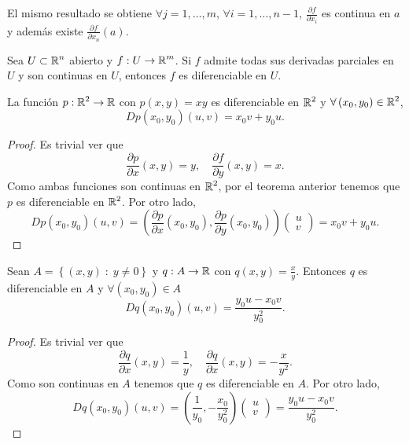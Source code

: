 \begin{observation}
El mismo resultado se obtiene $\displaystyle \forall j = 1, \ldots, m $, $\displaystyle \forall i = 1, \ldots, n-1 $, $\displaystyle \frac{\partial f}{\partial x_{i}} $ es continua en $\displaystyle a $ y además existe $\displaystyle \frac{\partial f}{\partial x_{n}}\left(a\right) $.
\end{observation}
\begin{colorary}
Sea $\displaystyle U \subset \mathbb{R}^{n} $ abierto y $\displaystyle f : U \to \mathbb{R}^{m} $. Si $\displaystyle f $ admite todas sus derivadas parciales en $\displaystyle U $ y son continuas en $\displaystyle U $, entonces $\displaystyle f $ es diferenciable en $\displaystyle U $.
\end{colorary}
\begin{lema}
La función $\displaystyle p : \mathbb{R}^{2} \to \mathbb{R} $ con $\displaystyle p\left(x,y\right) = xy $ es diferenciable en $\displaystyle \mathbb{R}^{2} $ y $\displaystyle \forall \left(x_{0}, y_{0}\right) \in \mathbb{R}^{2} $,
\[Dp\left(x_{0},y_{0}\right)\left(u,v\right) = x_{0}v + y_{0}u .\]
\end{lema}
\begin{proof}
Es trivial ver que
\[\frac{\partial p}{\partial x}\left(x,y\right) = y, \quad \frac{\partial f}{\partial y}\left(x,y\right) = x .\]
Como ambas funciones son continuas en $\displaystyle \mathbb{R}^{2} $, por el teorema anterior tenemos que $\displaystyle p $ es diferenciable en $\displaystyle \mathbb{R}^{2} $. Por otro lado,
\[Dp\left(x_{0},y_{0}\right)\left(u,v\right) = \left(\frac{\partial p}{\partial x}\left(x_{0}, y_{0}\right), \frac{\partial p}{\partial y}\left(x_{0}, y_{0}\right)\right)\begin{pmatrix} u \\ v \end{pmatrix} = x_{0}v + y_{0}u .\]
\end{proof}
\begin{lema}
	Sean $\displaystyle A = \left\{ \left(x,y\right) \; : \; y \neq 0\right\}  $ y $\displaystyle q : A \to \mathbb{R} $ con $\displaystyle q\left(x,y\right) = \frac{x}{y} $. Entonces $\displaystyle q $ es diferenciable en $\displaystyle A $ y $\displaystyle \forall \left(x_{0}, y_{0}\right) \in A $
	\[Dq\left(x_{0},y_{0}\right)\left(u,v\right) = \frac{y_{0}u - x_{0}v}{y_{0}^{2}}.\]
\end{lema}
\begin{proof}
Es trivial ver que
\[\frac{\partial q}{\partial x}\left(x,y\right) = \frac{1}{y}, \quad \frac{\partial q}{\partial x}\left(x,y\right) = -\frac{x}{y^{2}} .\]
Como son continuas en $\displaystyle A $ tenemos que $\displaystyle q $ es diferenciable en $\displaystyle A $. Por otro lado,
\[Dq\left(x_{0}, y_{0}\right)\left(u,v\right) = \left(\frac{1}{y_{0}}, -\frac{x_{0}}{y_{0}^{2}}\right)\begin{pmatrix} u \\ v \end{pmatrix} = \frac{y_{0}u - x_{0}v}{y_{0}^{2}} .\]
\end{proof}
